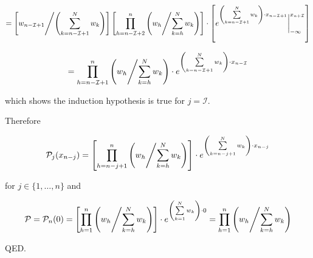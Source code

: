 \documentclass[fleqn]{article}
\begin{document}
$$
= \left[ w_{n - \mathcal{I} + 1} \middle/ \left(\sum\limits_{k = n - \mathcal{I} + 1}^N w_k \right)\right] \left[ \prod\limits_{h = n - \mathcal{I} + 2}^{n} \left( w_h \middle/ {\sum\limits_{k = h}^N w_k} \right) \right] \cdot \left[ e^{\left(\sum\limits_{k = n - \mathcal{I} + 1}^N w_k\right) \cdot x_{n - \mathcal{I} + 1}} \bigg\rvert_{-\infty}^{x_{n + \mathcal{I}}}\right]
$$

$$
= \prod\limits_{h = n - \mathcal{I} + 1}^{n} \left( w_h \middle/ {\sum\limits_{k = h}^N w_k} \right) \cdot e^{\left(\sum\limits_{k = n - \mathcal{I} + 1}^N w_k\right) \cdot x_{n - \mathcal{I}}}
$$

which shows the induction hypothesis is true for $j = \mathcal{I}$.

Therefore

$$
\mathcal{P}_j(x_{n - j}) = \left[ \prod\limits_{h = n - j + 1}^{n} \left( w_h \middle/ {\sum\limits_{k = h}^N w_k} \right) \right] \cdot e^{\left(\sum\limits_{k = n - j + 1}^N w_k\right) \cdot x_{n - j}}
$$

for $j \in \{1, \dots, n\}$ and

$$
\mathcal{P} = \mathcal{P}_n(0) = \left[ \prod\limits_{h = 1}^{n} \left( w_h \middle/ {\sum\limits_{k = h}^N w_k} \right) \right] \cdot e^{\left(\sum\limits_{k = 1}^N w_k\right) \cdot 0} = \prod\limits_{h = 1}^{n} \left( w_h \middle/ {\sum\limits_{k = h}^N w_k} \right)
$$

QED.
\end{document}
